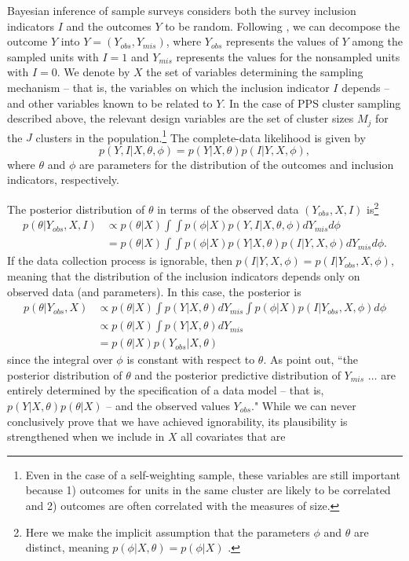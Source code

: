 \documentclass[12pt,a4paper]{article}
\begin{document}
Bayesian inference of sample surveys considers both the survey inclusion indicators $I$ and the outcomes $Y$ to be random. Following \cite{bda3}, we can decompose the outcome $Y$ into $Y=(Y_{obs}, Y_{mis})$, where $Y_{obs}$ represents the values of $Y$ among the sampled units with $I=1$ and $Y_{mis}$ represents the values for the nonsampled units with $I=0$. We denote by $X$ the set of variables determining the sampling mechanism -- that is, the variables on which the inclusion indicator $I$ depends -- and other variables known to be related to $Y$. In the case of PPS cluster sampling described above, the relevant design variables are the set of cluster sizes $M_j$ for the $J$ clusters in the population.\footnote{Even in the case of a self-weighting sample, these variables are still important because 1) outcomes for units in the same cluster are likely to be correlated and 2) outcomes are often correlated with the measures of size.} The complete-data likelihood is given by
\[
	p(Y, I | X, \theta, \phi) = p(Y|X,\theta)p(I|Y,X,\phi),
\]
where $\theta$ and $\phi$ are parameters for the distribution of the outcomes and inclusion indicators, respectively.

The posterior distribution of $\theta$ in terms of the observed data $(Y_{obs}, X, I)$ is\footnote{Here we make the implicit assumption that the parameters $\phi$ and $\theta$ are distinct, meaning $p(\phi|X,\theta)=p(\phi|X)$ \citep{bda3}.}
\begin{align*}
	p(\theta | Y_{obs}, X, I) &\propto p(\theta|X) \int \int p(\phi |X) p(Y, I|X, \theta,\phi) dY_{mis} d\phi \nonumber \\
	&= p(\theta|X) \int \int p(\phi |X) p(Y |X, \theta) p(I|Y, X, \phi) dY_{mis} d\phi.
\end{align*}
If the data collection process is ignorable, then $p(I|Y, X, \phi) = p(I|Y_{obs}, X, \phi)$, meaning that the distribution of the inclusion indicators depends only on observed data (and parameters). In this case, the posterior is
\begin{align}
	p(\theta | Y_{obs}, X) &\propto p(\theta|X) \int p(Y |X, \theta) dY_{mis} \int p(\phi |X)  p(I|Y_{obs}, X, \phi) d\phi  \\
	&\propto p(\theta|X) \int p(Y |X, \theta) dY_{mis} \\
	&= p(\theta|X) p(Y_{obs} |X, \theta)
\end{align}
since the integral over $\phi$ is constant with respect to $\theta$. As \cite{bda3} point out, ``the posterior distribution of $\theta$ and the posterior predictive distribution of $Y_{mis}$ $\ldots$ are entirely determined by the specification of a data model -- that is, $p(Y|X, \theta)p(\theta|X)$ -- and the observed values $Y_{obs}$." While we can never conclusively prove that we have achieved ignorability, its plausibility is strengthened when we include in $X$ all covariates that are 
\end{document}
